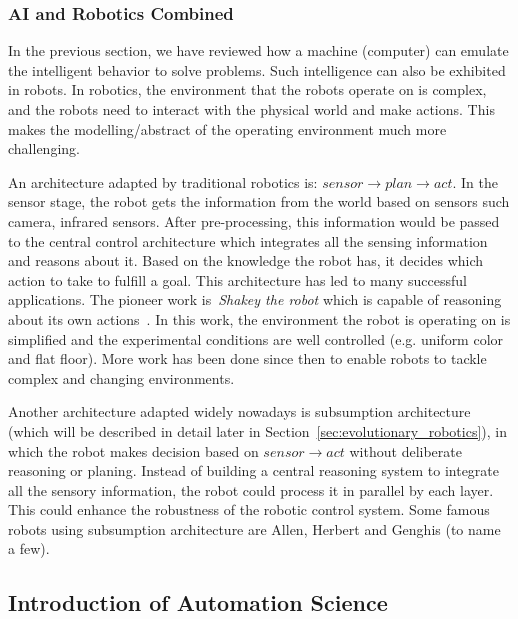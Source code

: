 \subsubsection{AI and Robotics Combined}

In the previous section, we have reviewed how a machine (computer) can emulate the intelligent behavior to solve problems. Such intelligence can also be exhibited in robots. In robotics, the environment that the robots operate on is complex, and the robots need to interact with the physical world and make actions. This makes the modelling/abstract of the operating environment much more challenging. 

An architecture adapted by traditional robotics is: $sensor \rightarrow plan \rightarrow act$. In the sensor stage, the robot gets the information from the world based on sensors such camera, infrared sensors. After pre-processing, this information would be passed to the central control architecture which integrates all the sensing information and reasons about it. Based on the knowledge the robot has, it decides which action to take to fulfill a goal. This architecture has led to many successful applications. The pioneer work is~\textit{Shakey the robot} which is capable of reasoning about its own actions~\cite{Nilsson1984}. In this work, the environment the robot is operating on is simplified and the experimental conditions are well controlled (e.g. uniform color and flat floor). More work has been done since then to enable robots to tackle complex and changing environments. 

Another architecture adapted widely nowadays is subsumption architecture~\cite{Brooks1986} (which will be described in detail later in Section~\ref{sec:evolutionary_robotics}), in which the robot makes decision based on $sensor \rightarrow act$ without deliberate reasoning or planing. Instead of building a central reasoning system to integrate all the sensory information, the robot could process it in parallel by each layer. This could enhance the robustness of the robotic control system.  Some famous robots using subsumption architecture are Allen, Herbert and Genghis (to name a few). 
 
\subsection{Introduction of Automation Science}


